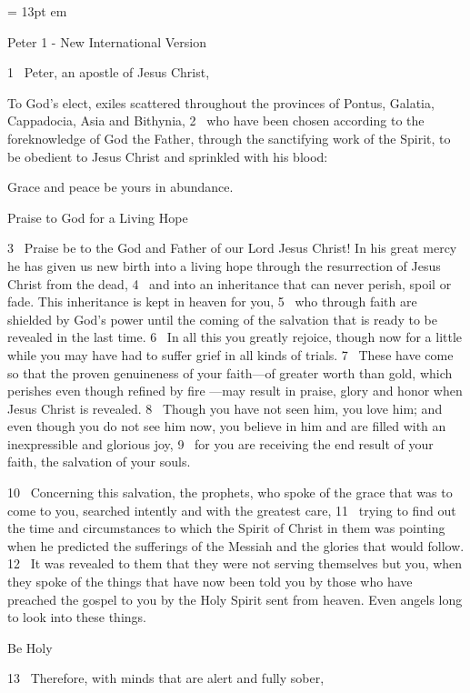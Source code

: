 

\FFrh \baselineskip = 13pt
 em


\centerline{   Peter 1 - New International Version }

\par
1 
Peter, an apostle of Jesus Christ,
\par
To God’s elect,
exiles
scattered
throughout the provinces of Pontus,
Galatia,
Cappadocia, Asia and Bithynia,
2 
who have been chosen according to the foreknowledge
of God the Father, through the sanctifying work of the Spirit,
to be obedient
to Jesus Christ and sprinkled with his blood:
\par
Grace and peace be yours in abundance.
\par
Praise to God for a Living Hope
\par
3 
Praise be to the God and Father of our Lord Jesus Christ!
In his great mercy
he has given us new birth
into a living hope
through the resurrection of Jesus Christ from the dead,
4 
and into an inheritance
that can never perish, spoil or fade.
This inheritance is kept in heaven for you,
5 
who through faith are shielded by God’s power
until the coming of the salvation
that is ready to be revealed
in the last time.
6 
In all this you greatly rejoice,
though now for a little while
you may have had to suffer grief in all kinds of trials.
7 
These have come so that the proven genuineness
of your faith—of greater worth than gold, which perishes even though refined by fire
—may result in praise, glory and honor
when Jesus Christ is revealed.
8 
Though you have not seen him, you love him; and even though you do not see him now, you believe in him
and are filled with an inexpressible and glorious joy,
9 
for you are receiving the end result of your faith, the salvation of your souls.
\par
10 
Concerning this salvation, the prophets, who spoke
of the grace that was to come to you,
searched intently and with the greatest care,
11 
trying to find out the time and circumstances to which the Spirit of Christ
in them was pointing when he predicted
the sufferings of the Messiah and the glories that would follow.
12 
It was revealed to them that they were not serving themselves but you,
when they spoke of the things that have now been told you by those who have preached the gospel to you
by the Holy Spirit sent from heaven.
Even angels long to look into these things.
\par
Be Holy
\par
13 
Therefore, with minds that are alert and fully sober,
